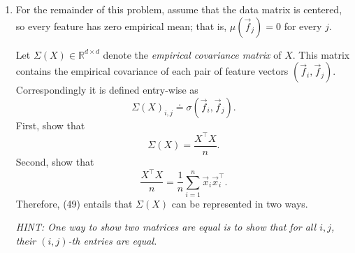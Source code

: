 \documentclass[10pt]{article}
\theoremstyle{definition}
\theoremstyle{plain}
\newcommand{\RR}{\mathbb{R}}
\begin{document}
\begin{enumerate}[label=(\alph*)]
\textbf{Solution:} We have
\begin{equation}
\sigma(\vec{y}, \vec{y}) = \frac{1}{k} \left( \vec{y} - \mu(\vec{y})\vec{1} \right)^\top \left( \vec{y} - \mu(\vec{y})\vec{1} \right) = \frac{1}{k} \left\| \vec{y} - \mu(\vec{y})\vec{1} \right\|_2^2 = \sigma^2(\vec{y}).
\end{equation}
In words, this means that the empirical covariance between a vector and itself is just its empirical variance.

\item For the remainder of this problem, assume that the data matrix is centered, so every feature has zero empirical mean; that is, $\mu(\vec{f}_j) = 0$ for every $j$.

Let $\Sigma(X) \in \RR^{d \times d}$ denote the \textit{empirical covariance matrix} of $X$. This matrix contains the empirical covariance of each pair of feature vectors $(\vec{f}_i, \vec{f}_j)$. Correspondingly it is defined entry-wise as
\begin{equation}
\Sigma(X)_{i,j} \doteq \sigma(\vec{f}_i, \vec{f}_j).
\end{equation}
First, show that
\begin{equation}
\Sigma(X) = \frac{X^\top X}{n}.
\end{equation}
Second, show that
\begin{equation}
\frac{X^\top X}{n} = \frac{1}{n} \sum_{i=1}^{n} \vec{x}_i \vec{x}_i^\top.
\end{equation}
Therefore, (49) entails that $\Sigma(X)$ can be represented in two ways.

\textit{HINT: One way to show two matrices are equal is to show that for all $i, j$, their $(i,j)$-th entries are equal.}


\end{enumerate}
\end{document}
